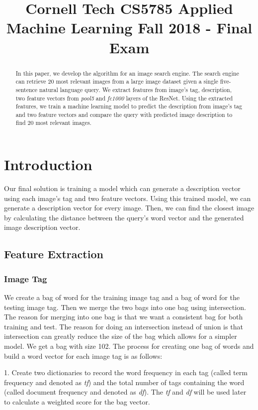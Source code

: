\documentclass{article} %
\title{Cornell Tech CS5785 Applied Machine Learning Fall 2018 - Final Exam}
\begin{document}
\maketitle

\begin{abstract}
In this paper, we develop the algorithm for an image search engine. The search engine can retrieve 20 most relevant images from a large image dataset given a single five-sentence natural language query. We extract features from image's tag, description, two feature vectors from \textit{pool5} and \textit{fc1000} layers of the ResNet. Using the extracted features, we train a machine learning model to predict the description from image's tag and two feature vectors and compare the query with predicted image description to find 20 most relevant images.
\end{abstract}

\section{Introduction}

Our final solution is training a model which can generate a description vector using each image's tag and two feature vectors. Using this trained model, we can generate a description vector for every image. Then, we can find the closest image by calculating the distance between the query's word vector and the generated image description vector.

\subsection{Feature Extraction}
\subsubsection{Image Tag}
We create a bag of word for the training image tag and a bag of word for the testing image tag. Then we merge the two bags into one bag using intersection. The reason for merging into one bag is that we want a consistent bag for both training and test. The reason for doing an intersection instead of union is that intersection can greatly reduce the size of the bag which allows for a simpler model. We get a bag with size 102. The process for creating one bag of words and build a word vector for each image tag is as follows:

1. Create two dictionaries to record the word frequency in each tag (called term frequency and denoted as \textit{tf}) and the total number of tags containing the word (called document frequency and denoted as \textit{df}). The \textit{tf} and \textit{df} will be used later to calculate a weighted score for the bag vector.
\end{document}
